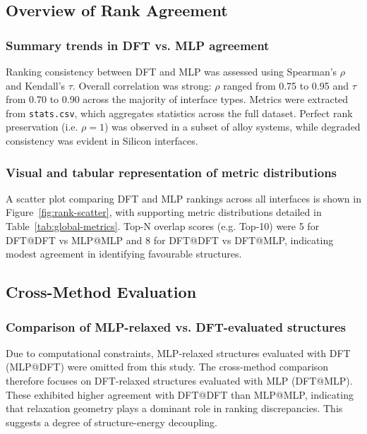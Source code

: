 \subsection{Overview of Rank Agreement}

\subsubsection{Summary trends in DFT vs. MLP agreement}

Ranking consistency between DFT and MLP was assessed using Spearman's $\rho$ and Kendall's $\tau$. Overall correlation
was strong: $\rho$ ranged from 0.75 to 0.95 and $\tau$ from 0.70 to 0.90 across the majority of interface types.
Metrics were extracted from \texttt{stats.csv}, which aggregates statistics across the full dataset. Perfect rank
preservation (i.e. $\rho = 1$) was observed in a subset of alloy systems, while degraded consistency was evident in
Silicon interfaces.

\subsubsection{Visual and tabular representation of metric distributions}

A scatter plot comparing DFT and MLP rankings across all interfaces is shown in Figure~\ref{fig:rank-scatter}, with
supporting metric distributions detailed in Table~\ref{tab:global-metrics}. Top-N overlap scores (e.g. Top-10) were 5
for DFT@DFT vs MLP@MLP and 8 for DFT@DFT vs DFT@MLP, indicating modest agreement in identifying favourable structures.

\subsection{Cross-Method Evaluation}

\subsubsection{Comparison of MLP-relaxed vs. DFT-evaluated structures}

Due to computational constraints, MLP-relaxed structures evaluated with DFT (MLP@DFT) were omitted from this study. The
cross-method comparison therefore focuses on DFT-relaxed structures evaluated with MLP (DFT@MLP). These exhibited
higher agreement with DFT@DFT than MLP@MLP, indicating that relaxation geometry plays a dominant role in ranking
discrepancies. This suggests a degree of structure-energy decoupling.

